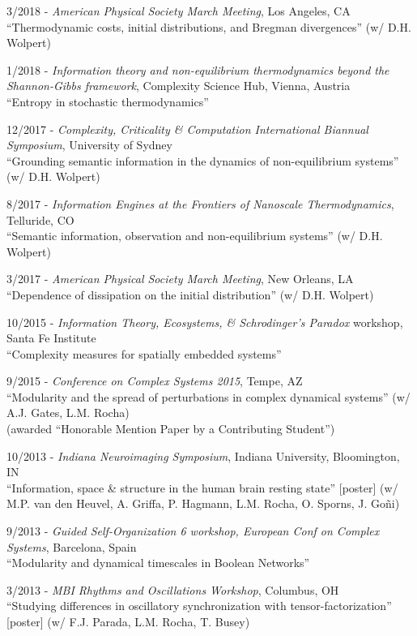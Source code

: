 \documentclass[margin,line,centered]{res}
\begin{document}
\begin{resume}
3/2018 - \emph{American Physical Society March Meeting}, Los Angeles, CA\\
``Thermodynamic costs, initial distributions, and Bregman divergences'' (w/ D.H. Wolpert)%

1/2018 - \emph{Information theory and non-equilibrium thermodynamics beyond the Shannon-Gibbs framework}, Complexity Science Hub, Vienna, Austria\\
``Entropy in stochastic thermodynamics''

12/2017 - \emph{Complexity, Criticality \& Computation International Biannual Symposium}, University of Sydney\\
``Grounding semantic information in the dynamics of non-equilibrium systems'' (w/ D.H. Wolpert)

8/2017 - \emph{Information Engines at the Frontiers of Nanoscale Thermodynamics}, Telluride, CO\\
``Semantic information, observation and non-equilibrium systems'' (w/ D.H. Wolpert) %

3/2017 - \emph{American Physical Society March Meeting}, New Orleans, LA\\
``Dependence of dissipation on the initial distribution'' (w/ D.H. Wolpert)%

10/2015 - \emph{Information Theory, Ecosystems, \& Schrodinger's Paradox} workshop, Santa Fe Institute\\
``Complexity measures for spatially embedded systems''

9/2015 - \emph{Conference on Complex Systems 2015}, Tempe, AZ\\
``Modularity and the spread of perturbations in complex dynamical systems'' (w/ A.J. Gates, L.M. Rocha)\\
(awarded ``Honorable Mention Paper by a Contributing Student'')

10/2013 - \emph{Indiana Neuroimaging Symposium}, Indiana University, Bloomington, IN\\
``Information, space \& structure in the human brain resting state'' [poster] (w/ M.P. van den Heuvel, A. Griffa, P. Hagmann, L.M. Rocha, O. Sporns, J. Goñi)

9/2013 - \emph{Guided Self-Organization 6 workshop, European Conf on Complex Systems}, Barcelona, Spain\\
``Modularity and dynamical timescales in Boolean Networks'' %

3/2013 - \emph{MBI Rhythms and Oscillations Workshop}, Columbus, OH\\
``Studying differences in oscillatory synchronization with tensor-factorization'' [poster]
(w/ F.J. Parada, L.M. Rocha, T. Busey)


\end{resume}
\end{document}
